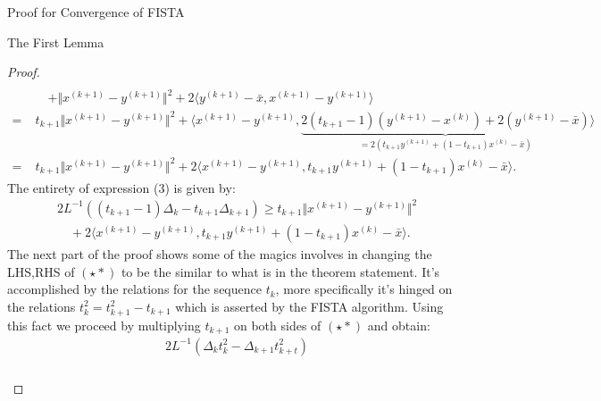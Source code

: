 \documentclass[]{article}
\theoremstyle{definition}
\begin{document}
\begin{section}{Proof for Convergence of FISTA}
\begin{subsection}{The First Lemma}
\begin{proof}
\begin{align*}
                \\
                & \quad 
                + \Vert x^{(k + 1)} - y^{(k + 1)}\Vert^2
                + 
                2\langle y^{(k + 1)} - \bar x, x^{(k + 1)} - y^{(k + 1)}\rangle
                \\
                = \; &
                t_{k + 1}\Vert x^{(k + 1)} - y^{(k + 1)}\Vert^2
                + 
                \langle 
                    x^{(k + 1)} - y^{(k + 1)}, 
                    \underbrace{2(t_{k + 1} - 1)(y^{(k + 1)} - x^{(k)}) + 2(y^{(k + 1)} - \bar x) }_
                    {
                        = 2(t_{k + 1}y^{(k + 1)} + (1 - t_{k + 1})x^{(k)} - \bar x)
                    }
                \rangle
                \\
                = \; & 
                t_{k + 1}\Vert x^{(k + 1)} - y^{(k + 1)}\Vert^2
                + 
                2\langle 
                    x^{(k + 1)} - y^{(k + 1)}, 
                    t_{k + 1}y^{(k + 1)} + (1 - t_{k + 1})x^{(k)} - \bar x
                \rangle. 
                \tag{$\star *$RHS}
            \end{align*}
            The entirety of expression (3) is given by: 
            \begin{align*}
                & 2L^{-1}((t_{k + 1} - 1)\Delta_k - t_{k + 1}\Delta_{k + 1})
                \ge 
                t_{k + 1}\Vert x^{(k + 1)} - y^{(k + 1)}\Vert^2
                \\
                & \quad 
                + 
                2\langle 
                    x^{(k + 1)} - y^{(k + 1)}, 
                    t_{k + 1}y^{(k + 1)} + (1 - t_{k + 1})x^{(k)} - \bar x
                \rangle. 
                \tag{$\star *$}
            \end{align*}
            The next part of the proof shows some of the magics involves in changing the LHS,RHS of $(\star *)$ to be the similar to what is in the theorem statement. It's accomplished by the relations for the sequence $t_k$, more specifically it's hinged on the relations $t_k^2 = t^2_{k + 1} - t_{k + 1}$ which is asserted by the FISTA algorithm. Using this fact we proceed by multiplying $t_{k + 1}$ on both sides of $(\star *)$ and obtain: 
            \begin{align*}
                & 2L^{-1}(\Delta_k t_k^2 - \Delta_{k + 1}t_{k + t}^2)
                \\
                & \hspace{2em}
                \begin{aligned}

\end{aligned}
\end{align*}
\end{proof}
\end{subsection}
\end{section}
\end{document}
